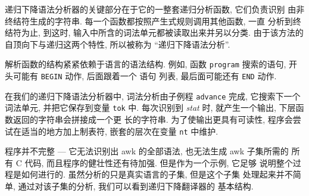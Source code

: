 递归下降语法分析器的关键部分在于它的一整套递归分析函数, 它们负责识别
由非终结符生成的字符串. 每一个函数都按照产生式规则调用其他函数, 一直
分析到终结符为止, 到这时, 输入中所含的词法单元都被读取出来并另以分类.
由于该方法的自顶向下与递归这两个特性, 所以被称为 ``递归下降语法分析''.

解析函数的结构紧紧依赖于语言的语法结构. 例如, 函数 \texttt{program}
搜索的语句, 开头可能有 \texttt{BEGIN} 动作, 后面跟着一个 \patact 语句
列表, 最后面可能还有 \texttt{END} 动作.

在我们的递归下降语法分析器中, 词法分析由子例程 \texttt{advance} 完成, 
它搜索下一个词法单元, 并把它保存到变量 \texttt{tok} 中. 每次识别到 
\textit{stat} 时, 就产生一个输出, 下层函数返回的字符串会拼接成一个更
长的字符串. 为了使输出更具有可读性, 程序会尝试在适当的地方加上制表符,
嵌套的层次在变量 \texttt{nt} 中维护.

程序并不完整 --- 它无法识别出 awk 的全部语法, 也无法生成 awk 子集所需的
所有 C 代码, 而且程序的健壮性还有待加强. 但是作为一个示例, 它足够
说明整个过程是如何进行的. 虽然分析的只是真实语言的子集, 但是这个子集
处理起来并不简单, 通过对该子集的分析, 我们可以看到递归下降翻译器的
基本结构.
